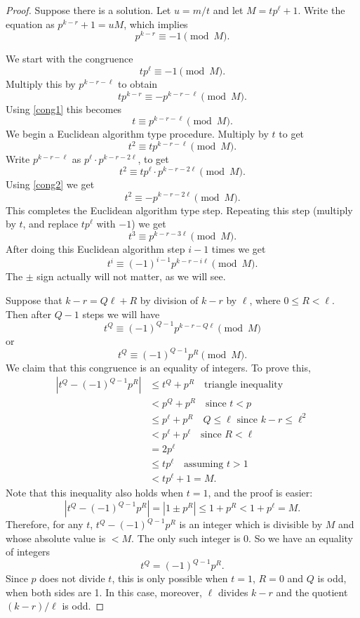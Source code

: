\documentclass[oneside,a4paper,12pt]{article}
\theoremstyle{plain} %
\theoremstyle{definition} %
\begin{document}
\begin{proof}
Suppose there is a solution.
Let $u=m/t$ and let $M=tp^\ell +1$. 
Write the equation as
$p^{k-r}+1=uM$,
which implies \begin{equation}\label{cong1}
p^{k-r}\equiv -1 \pmod{M}.
\end{equation}

We start with the congruence 
\begin{equation}\label{cong2}
tp^\ell \equiv -1 \pmod{M}.
\end{equation}
Multiply this by $p^{k-r-\ell}$ to obtain
\[
tp^{k-r}\equiv -p^{k-r-\ell} \pmod{M}.
\]
Using \eqref{cong1} this becomes
\[
t\equiv p^{k-r-\ell} \pmod{M}.
\]
We begin a Euclidean algorithm type procedure.
Multiply by $t$ to get
\[
t^2\equiv tp^{k-r-\ell} \pmod{M}.
\]
Write $p^{k-r-\ell}$ as $p^\ell \cdot p^{k-r-2\ell}$, to get
\[
t^2\equiv tp^\ell \cdot p^{k-r-2\ell} \pmod{M}.
\]
Using \eqref{cong2} we get
\[
t^2\equiv - p^{k-r-2\ell} \pmod{M}.
\]
This completes the Euclidean algorithm type step.
Repeating this step (multiply by $t$, and replace $tp^\ell$ with $-1$) we get
\[
t^3\equiv  p^{k-r-3\ell} \pmod{M}.
\]
After doing this Euclidean algorithm step $i-1$ times we get
\[
t^i\equiv (-1)^{i-1} p^{k-r-i\ell} \pmod{M}.
\]
The $\pm$ sign actually will not matter, as we will see.

Suppose that $k-r=Q \ell +R$ by division of $k-r$ by $\ell$, where $0\le R < \ell$. 
Then  after $Q-1$ steps  we will have
\[
t^Q\equiv (-1)^{Q-1} p^{k-r-Q\ell} \pmod{M}
\]
or
\[
t^Q\equiv (-1)^{Q-1} p^{R} \pmod{M}.
\]
We claim that this congruence is an equality of integers.
To prove this, 
\begin{align*}
|t^Q- (-1)^{Q-1} p^{R}| &\le t^Q+p^R \quad \text{triangle inequality}\\
&<p^Q+p^R \quad \text{since $t<p$}\\
&\le p^\ell+p^R \quad \text{$Q\le \ell$ since $k-r\le \ell^2$}\\
&<p^\ell+p^\ell \quad \text{since $R<\ell$}\\
&=2p^\ell\\
&\le tp^\ell \quad \text{assuming $t>1$}\\
&<tp^\ell +1=M.
\end{align*}
Note that this inequality also holds when $t=1$, and the proof is easier:
\[
|t^Q- (-1)^{Q-1} p^{R}| =|1\pm p^R|\le 1+p^R<1+p^\ell=M.
\]
Therefore, for any $t$,  $t^Q- (-1)^{Q-1} p^{R}$ is an integer which is divisible by $M$
and whose absolute value is $<M$.
The only such integer is 0. 
So we have an equality of integers
\[
t^Q= (-1)^{Q-1} p^{R}.
\]
Since $p$ does not divide $t$, this is only possible when $t=1$, 
$R=0$ and $Q$ is odd, when both sides are 1. 
In this case, moreover, $\ell$ divides $k-r$ and the quotient 
$(k-r)/\ell$ is odd. 


\end{proof}
\end{document}

